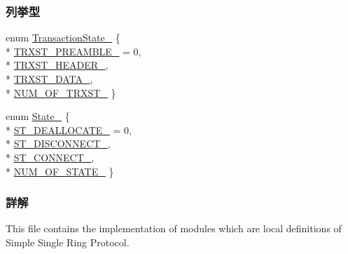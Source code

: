 \subsubsection*{列挙型}
\begin{DoxyCompactItemize}
\item 
enum \hyperlink{ssrp__def_8h_ab2e37133ccae2faa3b78d487d6a436f8_ab2e37133ccae2faa3b78d487d6a436f8}{Transaction\+State\+\_\+} \{ \\*
\hyperlink{ssrp__def_8h_ab2e37133ccae2faa3b78d487d6a436f8_ab2e37133ccae2faa3b78d487d6a436f8a37f2e9011f8baaed01f9d52fa89e8fdf}{T\+R\+X\+S\+T\+\_\+\+P\+R\+E\+A\+M\+B\+L\+E\+\_\+} = 0, 
\\*
\hyperlink{ssrp__def_8h_ab2e37133ccae2faa3b78d487d6a436f8_ab2e37133ccae2faa3b78d487d6a436f8a65655ff3d32706a3c57090a549fe762f}{T\+R\+X\+S\+T\+\_\+\+H\+E\+A\+D\+E\+R\+\_\+}, 
\\*
\hyperlink{ssrp__def_8h_ab2e37133ccae2faa3b78d487d6a436f8_ab2e37133ccae2faa3b78d487d6a436f8a05e9bfc4cc92bde3bc8fa198afaef2b0}{T\+R\+X\+S\+T\+\_\+\+D\+A\+T\+A\+\_\+}, 
\\*
\hyperlink{ssrp__def_8h_ab2e37133ccae2faa3b78d487d6a436f8_ab2e37133ccae2faa3b78d487d6a436f8a3e979d24d07bb3b497937841eb8d3eb2}{N\+U\+M\+\_\+\+O\+F\+\_\+\+T\+R\+X\+S\+T\+\_\+}
 \}
\item 
enum \hyperlink{ssrp__def_8h_a98b969cbcea8731d863416b2a2330c70_a98b969cbcea8731d863416b2a2330c70}{State\+\_\+} \{ \\*
\hyperlink{ssrp__def_8h_a98b969cbcea8731d863416b2a2330c70_a98b969cbcea8731d863416b2a2330c70a959c7926060a5acd417faab83e0765af}{S\+T\+\_\+\+D\+E\+A\+L\+L\+O\+C\+A\+T\+E\+\_\+} = 0, 
\\*
\hyperlink{ssrp__def_8h_a98b969cbcea8731d863416b2a2330c70_a98b969cbcea8731d863416b2a2330c70a1b1e8204bbdc0bc2d8c9d656730f3bf1}{S\+T\+\_\+\+D\+I\+S\+C\+O\+N\+N\+E\+C\+T\+\_\+}, 
\\*
\hyperlink{ssrp__def_8h_a98b969cbcea8731d863416b2a2330c70_a98b969cbcea8731d863416b2a2330c70a025dbc5860fa6a6de171d81aa74c3906}{S\+T\+\_\+\+C\+O\+N\+N\+E\+C\+T\+\_\+}, 
\\*
\hyperlink{ssrp__def_8h_a98b969cbcea8731d863416b2a2330c70_a98b969cbcea8731d863416b2a2330c70a3bdd3d6188b35d8a1f65b9ca52484b3b}{N\+U\+M\+\_\+\+O\+F\+\_\+\+S\+T\+A\+T\+E\+\_\+}
 \}
\end{DoxyCompactItemize}


\subsubsection{詳解}
This file contains the implementation of modules which are local definitions of Simple Single Ring Protocol. 

